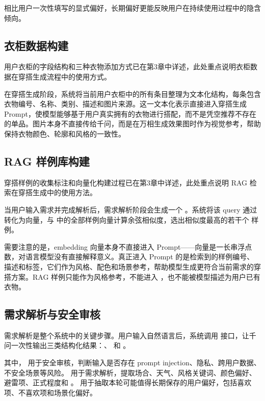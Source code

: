 \documentclass{applemlr}
\begin{document}
相比用户一次性填写的显式偏好，长期偏好更能反映用户在持续使用过程中的隐含倾向。

\subsection{衣柜数据构建}

用户衣柜的字段结构和三种衣物添加方式已在第3章中详述，此处重点说明衣柜数据在穿搭生成流程中的使用方式。

在穿搭生成阶段，系统将当前用户衣柜中的所有条目整理为文本化结构，每条包含衣物编号、名称、类别、描述和图片来源。这一文本化表示直接进入穿搭生成 Prompt，使模型能够基于用户真实拥有的衣物进行搭配，而不是凭空推荐不存在的单品。图片本身不直接传给千问，而是在万相生成效果图时作为视觉参考，帮助保持衣物颜色、轮廓和风格的一致性。

\subsection{RAG 样例库构建}

穿搭样例的收集标注和向量化构建过程已在第3章中详述，此处重点说明 RAG 检索在穿搭生成中的使用方法。

当用户输入需求并完成解析后，需求解析阶段会生成一个 。系统将该 query 通过  转化为向量，与  中的全部样例向量计算余弦相似度，选出相似度最高的若干个  样例。

需要注意的是，embedding 向量本身不直接进入 Prompt——向量是一长串浮点数，对语言模型没有直接解释意义。真正进入 Prompt 的是检索到的样例编号、描述和标签，它们作为风格、配色和场景参考，帮助模型生成更符合当前需求的穿搭方案。RAG 样例只能作为风格参考，不能进入 ，也不能被模型描述为用户已有衣物。

\subsection{需求解析与安全审核}

需求解析是整个系统中的关键步骤。用户输入自然语言后，系统调用  接口，让千问一次性输出三类结构化结果：、 和 。

其中， 用于安全审核，判断输入是否存在 prompt injection、隐私、跨用户数据、不安全场景等风险。 用于需求解析，提取场合、天气、风格关键词、颜色偏好、避雷项、正式程度和 。 用于抽取本轮可能值得长期保存的用户偏好，包括喜欢项、不喜欢项和场景化偏好。
\end{document}
